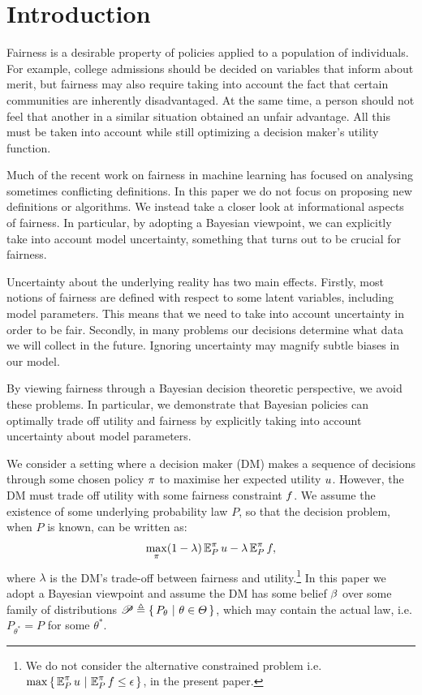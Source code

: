 \section{Introduction}
\label{sec:introduction}
Fairness is a desirable property of policies applied to a
population of individuals. For example, college admissions should be
decided on variables that inform about merit, but fairness may also
require taking into account the fact that certain communities are
inherently disadvantaged.  At the same time, a person should not feel
that another in a similar situation obtained an unfair advantage.  All
this must be taken into account while still optimizing a decision
maker's utility function.

Much of the recent work on fairness in machine learning has focused on
analysing sometimes conflicting definitions. In this paper we do not
focus on proposing new definitions or algorithms. We instead take a
closer look at informational aspects of fairness. In particular, by adopting a Bayesian viewpoint,
we can explicitly take into account model uncertainty, something that
turns out to be crucial for fairness.

Uncertainty about the underlying reality has two main
effects. Firstly, most notions of fairness are defined with respect to
some latent variables, including model parameters. This means that we
need to take into account uncertainty in order to be fair. Secondly,
in many problems our decisions determine what data we will collect in
the future. Ignoring uncertainty may magnify subtle biases in our model.

By viewing fairness through a Bayesian decision theoretic perspective,
we avoid these problems.  In particular, we demonstrate that Bayesian
policies can optimally trade off utility and fairness by explicitly
taking into account uncertainty about model parameters.

We consider a setting where a decision maker (DM) makes a sequence of
decisions through some chosen policy $\pi$ to maximise her expected
utility $u$. However, the DM must trade off utility with
some fairness constraint $f$. We assume the existence of some
underlying probability law $P$, so that the decision problem, when $P$
is known, can be written as:
\begin{align}
  \max_\pi  (1 - \lambda) \mathop{\mbox{\ensuremath{\mathbb{E}}}}\nolimits^\pi_P u - \lambda \mathop{\mbox{\ensuremath{\mathbb{E}}}}\nolimits^\pi_P f,
  \label{eq:oracle-decision-problem-weights}
\end{align}
where $\lambda$ is the DM's trade-off between fairness and utility.\footnote{We do not consider the alternative constrained problem i.e.  $\max \left\{\, \mathop{\mbox{\ensuremath{\mathbb{E}}}}\nolimits^\pi_P u ~\middle|~ \mathop{\mbox{\ensuremath{\mathbb{E}}}}\nolimits^\pi_P f \leq \epsilon \,\right\}$, in the present paper.} In this paper we adopt a Bayesian viewpoint and assume the DM has some belief $\beta$ over some family of distributions $\mathscr{P} \mathrel{\triangleq} \left\{\, P_\theta ~\middle|~ \theta \in \Theta \,\right\}$, which may contain the actual law, i.e. $P_{\theta^*} = P$ for some $\theta^*$.


